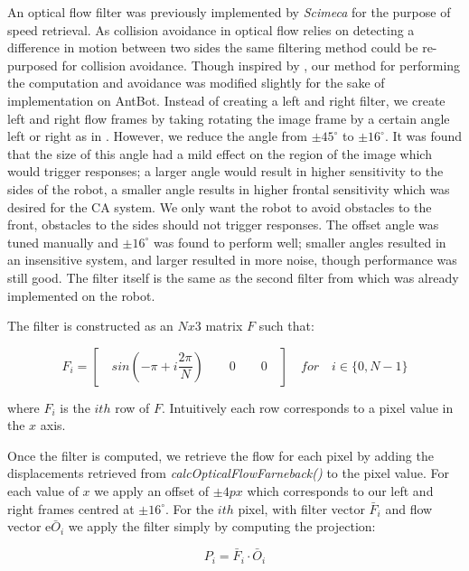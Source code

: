 \documentclass[a4paper,12pt]{article}
\begin{document}
An optical flow filter was previously implemented by \textit{Scimeca} for the purpose of speed retrieval. 
As collision avoidance in optical flow relies on detecting a difference in motion between two sides
the same filtering method could be re-purposed for collision avoidance. Though inspired by \cite{Stewart2010},
our method for performing the computation and avoidance was modified slightly for the sake of
implementation on AntBot. Instead of creating
a left and right filter, we create left and right flow frames by taking rotating the image frame
by a certain angle left or right as in \cite{Scimeca2017}. However, we reduce the angle from $\pm 45^{\circ}$
\cite{Scimeca2017} to $\pm 16^{\circ}$. It was found that the size of this angle had a mild effect on the region of the 
image which would trigger responses; a larger angle would result in higher sensitivity to the sides of the
robot, a smaller angle results in higher frontal sensitivity which was desired for the CA system. We only
want the robot to avoid obstacles to the front, obstacles to the sides should not trigger responses. The offset
angle was tuned manually and $\pm 16^{\circ}$ was found to perform well; smaller angles resulted in
an insensitive system, and larger resulted in more noise, though performance was still good. The filter
itself is the same as the second filter from \cite{Scimeca2017} which was already implemented on the robot.
\newline

The filter is constructed as an $Nx3$ matrix $F$ such that:

\begin{equation}
F_i = [ \quad sin(-\pi + i\frac{2\pi}{N}) \qquad 0 \qquad 0 \quad ] \quad \textit{for} \quad i \in \{0, N - 1\}
\end{equation}

where $F_i$ is the $ith$ row of $F$. Intuitively each row corresponds to a pixel value in the $x$ axis.
\newline

Once the filter is computed, we retrieve the flow for each pixel by adding the displacements
retrieved from \textit{calcOpticalFlowFarneback()} to the pixel value. 
For each value of $x$ we apply an offset of $\pm 4px$ which corresponds to our left and right frames centred at
$\pm 16^{\circ}$. For the $ith$ pixel, with filter vector $\bar F_i$ and flow vector  e$\bar O_i$ we apply the filter
simply by computing the projection:

\begin{equation}
  P_i = \bar F_i \cdot \bar O_i
\end{equation}
\end{document}
